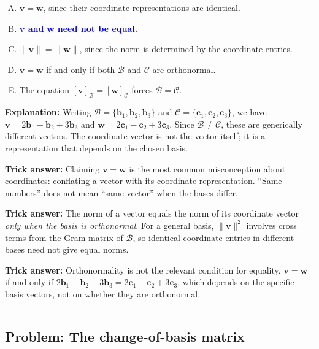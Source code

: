\documentclass[12pt]{amsart}
\newcommand{\divider}{
  \vspace{-1em}
  \noindent
  \raisebox{-0.15ex}{\textbullet}%
  \hspace{0.5em}%
  \rule[0.5ex]{0.95\textwidth}{1.0pt}%
  \hspace{0.5em}%
  \raisebox{-0.15ex}{\textbullet}%
  \vspace{0em}
}
\begin{document}
\begin{enumerate}[(A)]
\item $\mathbf{v} = \mathbf{w}$, since their coordinate representations are identical.
\item \textcolor{blue}{\textbf{$\mathbf{v}$ and $\mathbf{w}$ need not be equal.}}
\item $\|\mathbf{v}\| = \|\mathbf{w}\|$, since the norm is determined by the coordinate entries.
\item $\mathbf{v} = \mathbf{w}$ if and only if both $\mathcal{B}$ and $\mathcal{C}$ are orthonormal.
\item The equation $[\mathbf{v}]_{\mathcal{B}} = [\mathbf{w}]_{\mathcal{C}}$ forces $\mathcal{B} = \mathcal{C}$.
\end{enumerate}

\textbf{Explanation:}
Writing $\mathcal{B} = \{\mathbf{b}_1,\mathbf{b}_2,\mathbf{b}_3\}$ and
$\mathcal{C}=\{\mathbf{c}_1,\mathbf{c}_2,\mathbf{c}_3\}$, we have
$\mathbf{v} = 2\mathbf{b}_1 - \mathbf{b}_2 + 3\mathbf{b}_3$ and
$\mathbf{w} = 2\mathbf{c}_1 - \mathbf{c}_2 + 3\mathbf{c}_3$.
Since $\mathcal{B}\neq\mathcal{C}$, these are generically different vectors.
The coordinate vector is not the vector itself; it is a representation that
depends on the chosen basis.

\textbf{Trick answer:}
Claiming $\mathbf{v}=\mathbf{w}$ is the most common misconception about
coordinates: conflating a vector with its coordinate representation.
``Same numbers'' does not mean ``same vector'' when the bases differ.

\textbf{Trick answer:}
The norm of a vector equals the norm of its coordinate vector \emph{only when
the basis is orthonormal}.
For a general basis, $\|\mathbf{v}\|^2$ involves cross terms from the Gram matrix
of $\mathcal{B}$, so identical coordinate entries in different bases need not give
equal norms.

\textbf{Trick answer:}
Orthonormality is not the relevant condition for equality.
$\mathbf{v} = \mathbf{w}$ if and only if $2\mathbf{b}_1 - \mathbf{b}_2 + 3\mathbf{b}_3
= 2\mathbf{c}_1 - \mathbf{c}_2 + 3\mathbf{c}_3$, which depends on the specific basis
vectors, not on whether they are orthonormal.

\divider

\subsection*{Problem: The change-of-basis matrix}
\end{document}
